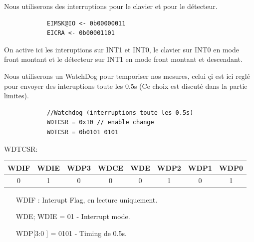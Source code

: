 \documentclass[a4paper, 12pt]{article}
\begin{document}
		Nous utiliserons des interruptions pour le clavier et pour le détecteur.
		\begin{lstlisting}
			EIMSK@IO <- 0b00000011
			EICRA <- 0b00001101 
		\end{lstlisting}
		On active ici les interuptions sur INT1 et INT0, le clavier sur INT0 en mode front montant et le détecteur sur INT1 en mode front montant et descendant.
		
		Nous utiliserons un WatchDog pour temporiser nos mesures, celui çi est ici reglé pour envoyer des interuptions toute les 0.5s (Ce choix est discuté dans la partie limites).
		\begin{lstlisting}
			//Watchdog (interruptions toute les 0.5s)
			WDTCSR = 0x10 // enable change
			WDTCSR = 0b0101 0101
		\end{lstlisting}
		WDTCSR:
		\begin{center}
			\begin{tabular}{|c|c|c|c|c|c|c|c|}
				\hline
				WDIF & WDIE & WDP3 & WDCE & WDE & WDP2 & WDP1 & WDP0\\
				\hline
				0 & 1 & 0 & 0 & 0 & 1 & 0 & 1\\
				\hline
			\end{tabular}
		\end{center}
		\begin{itemize}
			\item[WDIF] : Interupt Flag, en lecture uniquement.
			\item[WDE; WDIE] = 01 - Interrupt mode.
			\item[WDP[3:0]] = 0101 - Timing de 0.5s.
		\end{itemize}
\end{document}
